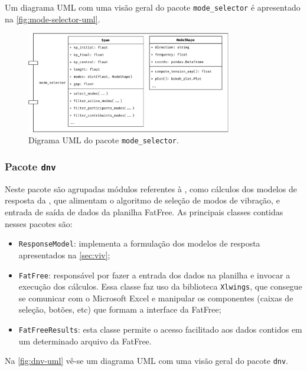 Um diagrama UML com uma visão geral do pacote \texttt{mode\_selector} é apresentado na \autoref{fig:mode-selector-uml}.

\begin{figure}[!ht]
    \centering
    \caption{Digrama UML do pacote \texttt{mode\_selector}.}\label{fig:mode-selector-uml}
    \includegraphics[width=0.8\textwidth]{imagens/mode-selector-uml}
\end{figure}


\subsubsection{Pacote \texttt{dnv}}

Neste pacote são agrupadas módulos referentes à , como cálculos dos modelos de resposta da , que alimentam o algoritmo de seleção de modos de vibração, e entrada de saída de dados da planilha FatFree. As principais classes contidas nesses pacotes são:

\begin{itemize}
    \item \texttt{ResponseModel}: implementa a formulação dos modelos de resposta apresentados na \autoref{sec:viv};

    \item \texttt{FatFree}: responsável por fazer a entrada dos dados na planilha e invocar a execução dos cálculos. Essa classe faz uso da biblioteca \texttt{Xlwings}, que consegue se comunicar com o Microsoft Excel e manipular os componentes (caixas de seleção, botões, etc) que formam a interface da FatFree;

    \item \texttt{FatFreeResults}: esta classe permite o acesso facilitado aos dados contidos em um determinado arquivo da FatFree.
\end{itemize}

Na \autoref{fig:dnv-uml} vê-se um diagrama UML com uma visão geral do pacote \texttt{dnv}.

